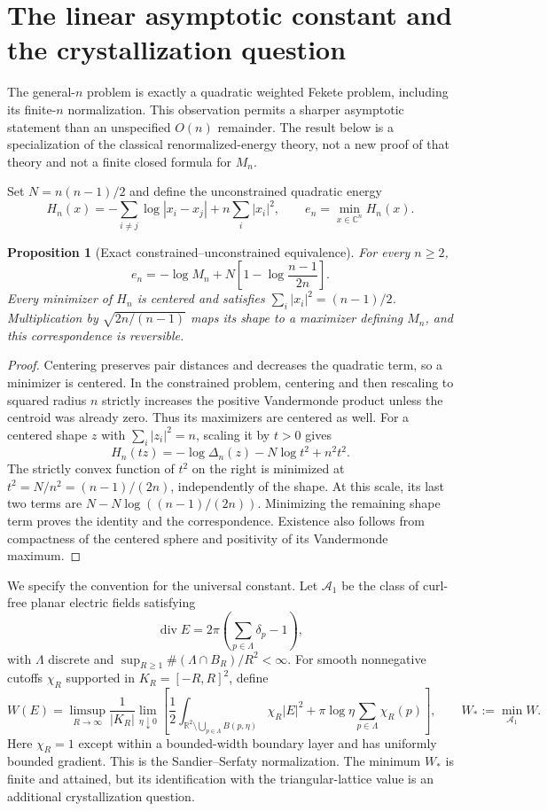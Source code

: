 \documentclass[11pt]{article}
\newtheorem{proposition}[theorem]{Proposition}
\theoremstyle{remark}
\numberwithin{equation}{section}
\begin{document}
\section{The linear asymptotic constant and the crystallization question}
\label{sec:uniform-linear-constant}
The general-$n$ problem is exactly a quadratic weighted Fekete problem,
including its finite-$n$ normalization. This observation permits a sharper
asymptotic statement than an unspecified $O(n)$ remainder. The result
below is a specialization of the classical renormalized-energy theory,
not a new proof of that theory and not a finite closed formula for $M_n$.

Set $N=n(n-1)/2$ and define the unconstrained quadratic energy
\[
 H_n(x)=-\sum_{i\ne j}\log|x_i-x_j|+n\sum_i|x_i|^2,
 \qquad e_n=\min_{x\in\mathbb C^n}H_n(x).
\]
\begin{proposition}[Exact constrained--unconstrained equivalence]
\label{prop:uniform-gaussian-equivalence}
For every $n\ge2$,
\begin{equation}\label{eq:uniform-gaussian-equivalence}
 e_n=-\log M_n+N\left[1-\log\frac{n-1}{2n}\right].
\end{equation}
Every minimizer of $H_n$ is centered and satisfies
$\sum_i|x_i|^2=(n-1)/2$. Multiplication by
$\sqrt{2n/(n-1)}$ maps its shape to a maximizer defining $M_n$, and
this correspondence is reversible.
\end{proposition}
\begin{proof}
Centering preserves pair distances and decreases the quadratic term,
so a minimizer is centered. In the constrained problem, centering and
then rescaling to squared radius $n$ strictly increases the positive
Vandermonde product unless the centroid was already zero. Thus its
maximizers are centered as well. For a centered shape $z$ with
$\sum_i|z_i|^2=n$, scaling it by $t>0$ gives
\[
 H_n(tz)=-\log\Delta_n(z)-N\log t^2+n^2t^2.
\]
The strictly convex function of $t^2$ on the right is minimized at
$t^2=N/n^2=(n-1)/(2n)$, independently of the shape. At this scale,
its last two terms are $N-N\log((n-1)/(2n))$.
Minimizing the remaining shape term proves the identity and the
correspondence. Existence also follows from compactness of the
centered sphere and positivity of its Vandermonde maximum.
\end{proof}

We specify the convention for the universal constant. Let
$\mathcal A_1$ be the class of curl-free planar electric fields satisfying
\[
 \operatorname{div}E=2\pi\left(\sum_{p\in\Lambda}\delta_p-1\right),
\]
with $\Lambda$ discrete and
$\sup_{R\ge1}\#(\Lambda\cap B_R)/R^2<\infty$.
For smooth nonnegative cutoffs $\chi_R$ supported in
$K_R=[-R,R]^2$, define
\[
 W(E)=\limsup_{R\to\infty}\frac1{|K_R|}
 \lim_{\eta\downarrow0}\left[
 \frac12\int_{\mathbb R^2\setminus\bigcup_{p\in\Lambda}B(p,\eta)}
 \chi_R|E|^2+\pi\log\eta\sum_{p\in\Lambda}\chi_R(p)\right],
 \qquad W_*:=\min_{\mathcal A_1}W.
\]
Here $\chi_R=1$ except within a bounded-width boundary layer and has
uniformly bounded gradient. This is the Sandier--Serfaty normalization.
The minimum $W_*$ is finite and attained, but its identification with
the triangular-lattice value is an additional crystallization question.
\end{document}
